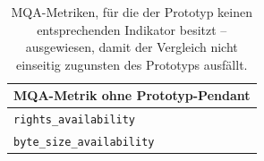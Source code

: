 \begin{table}[H]
    \centering
    \small
    \renewcommand{\arraystretch}{1.2}
    \begin{tabular}{l}
    \toprule
    \textbf{MQA-Metrik ohne Prototyp-Pendant} \\
    \midrule
    \texttt{rights\_availability} \\
    \texttt{byte\_size\_availability} \\
    \bottomrule
    \end{tabular}
    \captionsetup{justification=centering}
    \caption[MQA-Metriken ohne Prototyp-Pendant]{MQA-Metriken, für die der Prototyp keinen entsprechenden Indikator besitzt -- ausgewiesen, damit der Vergleich nicht einseitig zugunsten des Prototyps ausfällt.}
    \label{tab:mqa_only_metrics}
\end{table}